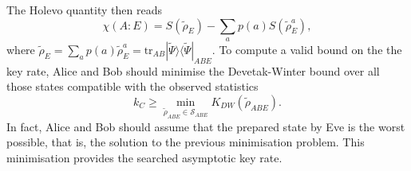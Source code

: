 \documentclass[a4paper]{article}
\def\tr{\mbox{tr}}
\def\bra#1{\langle#1|} \def\ket#1{|#1\rangle}
\def\proj#1{\ket{#1}\!\bra{#1}}
\begin{document}
\begin{itemize}
The Holevo quantity then reads
\begin{equation}
    \chi(A:E)=S(\tilde\rho_E)-\sum_a p(a)S(\tilde\rho_E^a) ,
\end{equation}
where $\tilde\rho_E=\sum_a p(a)\tilde\rho_E^a=\tr_{AB}\proj{\tilde\Psi}_{ABE}$. 
To compute a valid bound on the the key rate, Alice and Bob should minimise the Devetak-Winter bound over all those states compatible with the observed statistics
\begin{equation}\label{dwbound}
    k_C\geq \min_{\tilde\rho_{ABE}\in\mathcal S_{ABE}}K_{DW}(\tilde\rho_{ABE}) .
\end{equation}
In fact, Alice and Bob should assume that the prepared state by Eve is the worst possible, that is, the solution to the previous minimisation problem. This minimisation provides the searched asymptotic key rate.
\end{itemize}
\end{document}
